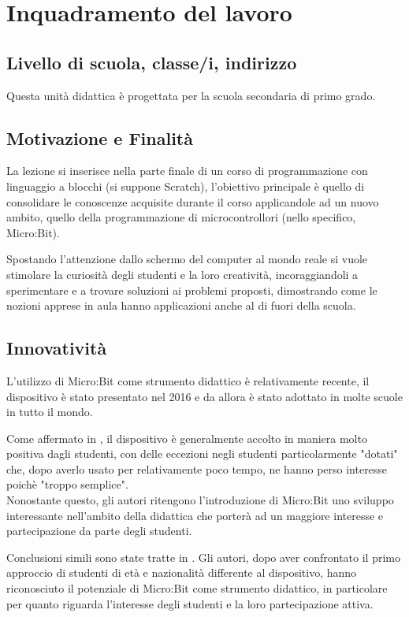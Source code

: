 \documentclass[../../relazione.tex]{subfiles}
\begin{document}
\section{Inquadramento del lavoro}

\subsection{Livello di scuola, classe/i, indirizzo}
Questa unità didattica è progettata per la scuola secondaria di primo grado.

\subsection{Motivazione e Finalità}
La lezione si inserisce nella parte finale di un corso di programmazione con linguaggio a blocchi (si suppone Scratch), l'obiettivo principale è quello di consolidare le conoscenze acquisite durante il corso applicandole ad un nuovo ambito, quello della programmazione di microcontrollori (nello specifico, Micro:Bit).

Spostando l'attenzione dallo schermo del computer al mondo reale si vuole stimolare la curiosità degli studenti e la loro creatività, incoraggiandoli a sperimentare e a trovare soluzioni ai problemi proposti, dimostrando come le nozioni apprese in aula hanno applicazioni anche al di fuori della scuola.

\subsection{Innovatività}
L'utilizzo di Micro:Bit come strumento didattico è relativamente recente, il dispositivo è stato presentato nel 2016 e da allora è stato adottato in molte scuole in tutto il mondo.

Come affermato in \cite{10.1145/3137065.3137083}, il dispositivo è generalmente accolto in maniera molto positiva dagli studenti, con delle eccezioni negli studenti particolarmente "dotati" che, dopo averlo usato per relativamente poco tempo, ne hanno perso interesse poichè "troppo semplice".\\
Nonostante questo, gli autori ritengono l'introduzione di Micro:Bit uno sviluppo interessante nell'ambito della didattica che porterà ad un maggiore interesse e partecipazione da parte degli studenti.

Conclusioni simili sono state tratte in \cite{8424786}. Gli autori, dopo aver confrontato il primo approccio di studenti di età e nazionalità differente al dispositivo, hanno riconosciuto il potenziale di Micro:Bit come strumento didattico, in particolare per quanto riguarda l'interesse degli studenti e la loro partecipazione attiva.
\end{document}
